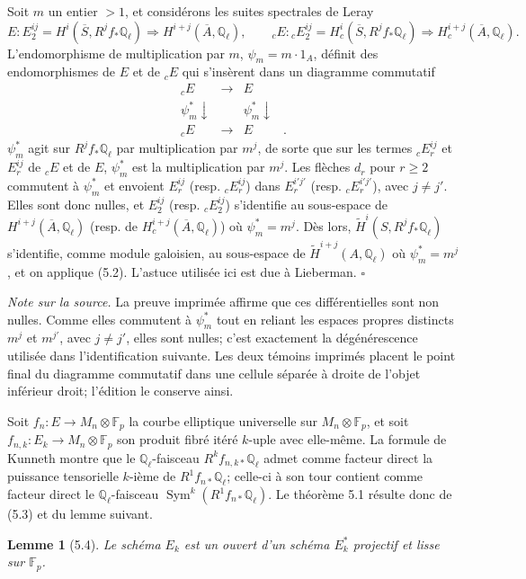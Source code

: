 \documentclass[10pt]{article}
\newcommand{\Q}{\mathbb Q}
\newcommand{\Sym}{\operatorname{Sym}}
\newcommand{\QED}{\hfill$\square$}
\newcommand{\F}{\mathbb F}
\newtheorem*{lemma}{Lemme}
\begin{document}
Soit $m$ un entier $>1$, et considérons les suites spectrales de Leray
\[
E:
E_2^{ij}=H^i(\overline S,R^jf_*\Q_\ell)\Longrightarrow H^{i+j}(\overline A,\Q_\ell),
\qquad
{}_cE:
{}_cE_2^{ij}=H_c^i(\overline S,R^jf_*\Q_\ell)\Longrightarrow H_c^{i+j}(\overline A,\Q_\ell).
\]
L'endomorphisme de multiplication par $m$, $\psi_m=m\cdot1_A$, définit des endomorphismes de $E$ et de ${}_cE$ qui s'insèrent dans un diagramme commutatif
\[
\begin{array}{cccc}
{}_cE&\longrightarrow&E\\
\psi_m^*\downarrow&&\psi_m^*\downarrow\\
{}_cE&\longrightarrow&E&\text{.}
\end{array}
\]
$\psi_m^*$ agit sur $R^jf_*\Q_\ell$ par multiplication par $m^j$, de sorte que sur les termes ${}_cE_r^{ij}$ et $E_r^{ij}$ de ${}_cE$ et de $E$, $\psi_m^*$ est la multiplication par $m^j$. Les flèches $d_r$ pour $r\ge2$ commutent à $\psi_m^*$ et envoient $E_r^{ij}$ (resp. ${}_cE_r^{ij}$) dans $E_r^{i'j'}$ (resp. ${}_cE_r^{i'j'}$), avec $j\ne j'$. Elles sont donc nulles, et $E_2^{ij}$ (resp. ${}_cE_2^{ij}$) s'identifie au sous-espace de $H^{i+j}(\overline A,\Q_\ell)$ (resp. de $H_c^{i+j}(\overline A,\Q_\ell)$) où $\psi_m^*=m^j$. Dès lors, $\widetilde H^i(S,R^jf_*\Q_\ell)$ s'identifie, comme module galoisien, au sous-espace de $\widetilde H^{i+j}(A,\Q_\ell)$ où $\psi_m^*=m^j$, et on applique (5.2). L'astuce utilisée ici est due à Lieberman. \QED

\noindent\emph{Note sur la source.} La preuve imprimée affirme que ces différentielles sont non nulles. Comme elles commutent à $\psi_m^*$ tout en reliant les espaces propres distincts $m^j$ et $m^{j'}$, avec $j\ne j'$, elles sont nulles; c'est exactement la dégénérescence utilisée dans l'identification suivante. Les deux témoins imprimés placent le point final du diagramme commutatif dans une cellule séparée à droite de l'objet inférieur droit; l'édition le conserve ainsi.

Soit $f_n:E\to M_n\otimes\F_p$ la courbe elliptique universelle sur $M_n\otimes\F_p$, et soit $f_{n,k}:E_k\to M_n\otimes\F_p$ son produit fibré itéré $k$-uple avec elle-même. La formule de Kunneth montre que le $\Q_\ell$-faisceau $R^kf_{n,k*}\Q_\ell$ admet comme facteur direct la puissance tensorielle $k$-ième de $R^1f_{n*}\Q_\ell$; celle-ci à son tour contient comme facteur direct le $\Q_\ell$-faisceau $\Sym^k(R^1f_{n*}\Q_\ell)$. Le théorème 5.1 résulte donc de (5.3) et du lemme suivant.

\begin{lemma}[5.4]
Le schéma $E_k$ est un ouvert d'un schéma $E_k^*$ projectif et lisse sur $\F_p$.
\end{lemma}
\end{document}
